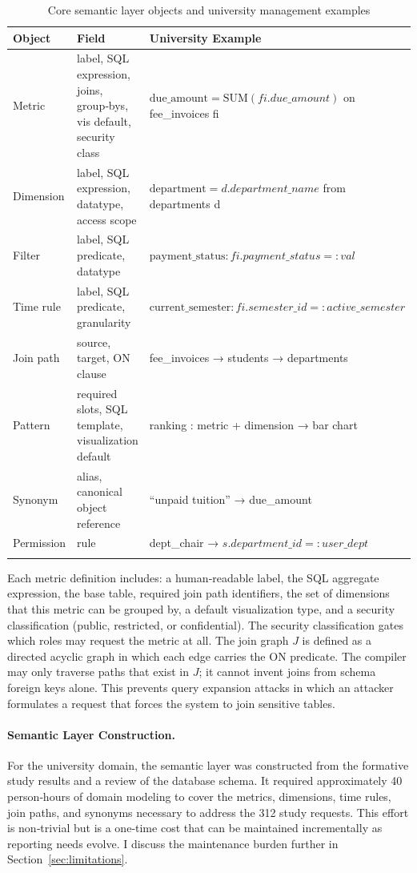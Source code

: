 \documentclass[11pt]{article}
\begin{document}
\begin{longtable}{lll}
\toprule
\textbf{Object} & \textbf{Field} & \textbf{University Example}\\
\midrule
Metric & label, SQL expression, joins, group‑bys, vis default, security class & $\mathrm{due\_amount} = \mathrm{SUM}(fi.due\_amount)$ on fee\_invoices fi\\
Dimension & label, SQL expression, datatype, access scope & $\mathrm{department} = d.department\_name$ from departments d\\
Filter & label, SQL predicate, datatype & $\mathrm{payment\_status} : fi.payment\_status = :val$\\
Time rule & label, SQL predicate, granularity & $\mathrm{current\_semester} : fi.semester\_id = :active\_semester$\\
Join path & source, target, ON clause & fee\_invoices → students → departments\\
Pattern & required slots, SQL template, visualization default & ranking : metric + dimension → bar chart\\
Synonym & alias, canonical object reference & ``unpaid tuition'' → due\_amount\\
Permission & rule & dept\_chair → $s.department\_id = :user\_dept$\\
\bottomrule
\caption{Core semantic layer objects and university management examples}\label{tab:semantic}
\end{longtable}

Each metric definition includes: a human‑readable label, the SQL aggregate expression, the base table, required join path identifiers, the set of dimensions that this metric can be grouped by, a default visualization type, and a security classification (public, restricted, or confidential). The security classification gates which roles may request the metric at all. The join graph $J$ is defined as a directed acyclic graph in which each edge carries the ON predicate. The compiler may only traverse paths that exist in $J$; it cannot invent joins from schema foreign keys alone. This prevents query expansion attacks in which an attacker formulates a request that forces the system to join sensitive tables.

\paragraph{Semantic Layer Construction.} For the university domain, the semantic layer was constructed from the formative study results and a review of the database schema. It required approximately 40 person‑hours of domain modeling to cover the metrics, dimensions, time rules, join paths, and synonyms necessary to address the 312 study requests. This effort is non‑trivial but is a one‑time cost that can be maintained incrementally as reporting needs evolve. I discuss the maintenance burden further in Section~\ref{sec:limitations}.
\end{document}

